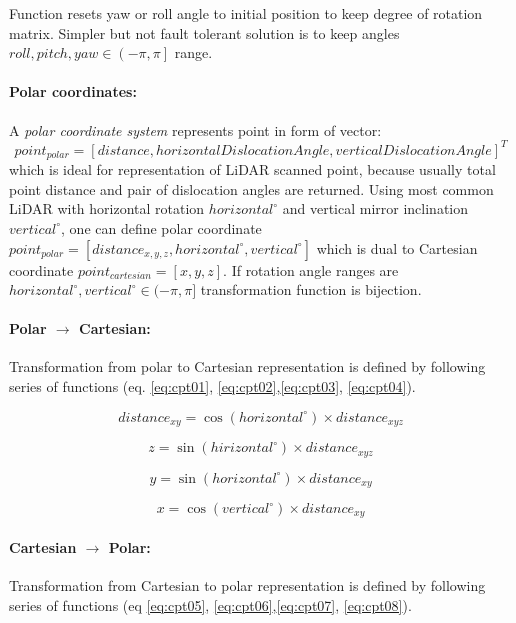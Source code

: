 \noindent Function resets yaw or roll angle to initial position to keep degree of rotation matrix. Simpler but not fault tolerant solution is to keep angles $roll,pitch,yaw \in \left (  -\pi,\pi\right ]$ range.


\paragraph{Polar coordinates:} A \emph{polar coordinate system} represents point in form of vector:
\begin{equation*}
    point_{polar}=[distance, horizontal Dislocation Angle, vertical Dislocation Angle]^T
\end{equation*}
which is ideal for representation of LiDAR scanned point, because usually total point distance and pair of dislocation angles are returned. Using most common LiDAR with horizontal rotation $horizontal^\circ$ and vertical mirror inclination $vertical^\circ$, one can define polar coordinate $point_{polar} = [distance_{x,y,z},horizontal^\circ,vertical^\circ]$ which is dual to Cartesian coordinate $point_{cartesian} = [x,y,z]$. If rotation angle  ranges are $horizontal^\circ,vertical^\circ\in(-\pi,\pi]$ transformation function is bijection.

\paragraph{Polar $\to$ Cartesian:} Transformation from polar to Cartesian representation is defined by following series of functions (eq. \ref{eq:cpt01}, \ref{eq:cpt02},\ref{eq:cpt03}, \ref{eq:cpt04}).

\begin{equation}\label{eq:cpt01}
    distance_{xy} = \cos(horizontal^\circ)\times distance_{xyz}
\end{equation}

\begin{equation}\label{eq:cpt02}
    z = \sin(hirizontal^\circ)\times distance_{xyz}
\end{equation}

\begin{equation}\label{eq:cpt03}
    y = \sin(horizontal^\circ)\times distance_{xy}
\end{equation}

\begin{equation}\label{eq:cpt04}
    x = \cos(vertical^\circ) \times distance_{xy}
\end{equation}


\paragraph{Cartesian $\to$ Polar:} Transformation from Cartesian to polar representation is defined by following series of functions (eq \ref{eq:cpt05}, \ref{eq:cpt06},\ref{eq:cpt07}, \ref{eq:cpt08}).

